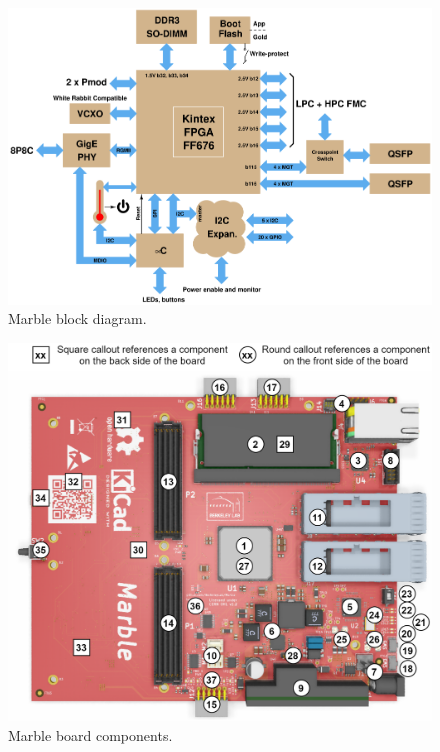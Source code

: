 \documentclass[12pt,oneside,a4]{article}
\begin{document}
\begin{figure}[H]
\begin{center}
\includegraphics[width=1\linewidth]{block_k3.png}
 \caption{Marble block diagram.}\label{block}
\end{center}
\end{figure}

\begin{figure}[H]
\begin{center}
\includegraphics[width=1\linewidth]{marble_references.png}
 \caption{Marble board components.}\label{block}
\end{center}
\end{figure}
\end{document}
